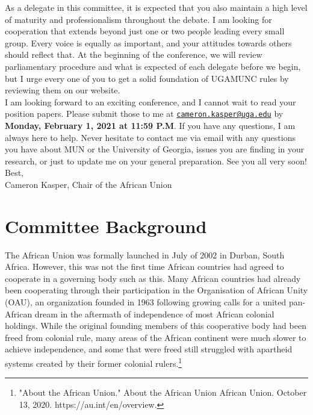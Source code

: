 \documentclass[10pt, letterpaper]{article}
\begin{document}
As a delegate in this committee, it is expected that you also maintain a
high level of maturity and professionalism throughout the debate. I am
looking for cooperation that extends beyond just one or two people
leading every small group. Every voice is equally as important, and your
attitudes towards others should reflect that. At the beginning of the
conference, we will review parliamentary procedure and what is expected
of each delegate before we begin, but I urge every one of you to get a
solid foundation of UGAMUNC rules by reviewing them on our website. \\

I am looking forward to an exciting conference, and I cannot wait to
read your position papers. Please submit those to me at \texttt{\href{mailto:cjk82979@uga.edu}{cameron.kasper@uga.edu}} by
\textbf{Monday, February 1, 2021 at 11:59 P.M}. If you have any
questions, I am always here to help. Never hesitate to contact me via
email with any questions you have about MUN or the University of
Georgia, issues you are finding in your research, or just to update me
on your general preparation. See you all very soon! \\

Best,\\
Cameron Kasper, Chair of the African Union

\newpage
\tableofcontents
\newpage

\section{Committee Background}

The African Union was formally launched in July of 2002 in Durban, South
Africa. However, this was not the first time African countries had
agreed to cooperate in a governing body such as this. Many African
countries had already been cooperating through their participation in
the Organisation of African Unity (OAU), an organization founded in 1963
following growing calls for a united pan-African dream in the aftermath
of independence of most African colonial holdings. While the original
founding members of this cooperative body had been freed from colonial
rule, many areas of the African continent were much slower to achieve
independence, and some that were freed still struggled with apartheid
systems created by their former colonial rulers.\footnote{"About the
  African Union." About the African Union \textbar{} African Union.
  October 13, 2020. https://au.int/en/overview.} \\
\end{document}
